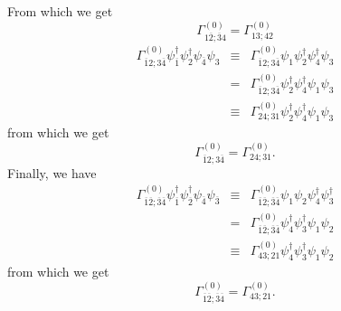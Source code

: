 From which we get
\begin{equation}
\Gamma^{(0)}_{1\overline{2};\overline{3}4}
= \Gamma^{(0)}_{1 3; 4 2}
\end{equation}
\begin{eqnarray}
\Gamma^{(0)}_{\overline{1}2;3\overline{4}}
\psi^{\dagger}_{\overline{1}}\psi^{\dagger}_2
\psi_{\overline{4}} \psi_3 
&  \equiv &
\Gamma^{(0)}_{\overline{1}2;3\overline{4}}
\psi_1\psi^{\dagger}_2
\psi^{\dagger}_4 \psi_3  \\
& = & \Gamma^{(0)}_{\overline{1}2;3\overline{4}}
\psi^{\dagger}_2\psi^{\dagger}_4\psi_1\psi_3 \\
& \equiv & \Gamma^{(0)}_{24;31}
\psi^{\dagger}_2\psi^{\dagger}_4\psi_1\psi_3
\end{eqnarray}
from which we get
\begin{equation}
\Gamma^{(0)}_{\overline{1}2;3\overline{4}} =
\Gamma^{(0)}_{24;31}.
\end{equation}
Finally, we have
\begin{eqnarray}
\Gamma^{(0)}_{\overline{1}\overline{2};\overline{3}\overline{4}}
\psi^{\dagger}_{\overline{1}}\psi^{\dagger}_{\overline{2}}
\psi_{\overline{4}} \psi_{\overline{3}} 
&  \equiv &
\Gamma^{(0)}_{\overline{1}\overline{2};\overline{3}\overline{4}}
\psi_1\psi_2
\psi^{\dagger}_4 \psi^{\dagger}_3  \\
& = &
\Gamma^{(0)}_{\overline{1}\overline{2};\overline{3}\overline{4}}
\psi^{\dagger}_4 \psi^{\dagger}_3 \psi_1\psi_2 \\
& \equiv &
\Gamma^{(0)}_{4 3; 2 1} \psi^{\dagger}_4 \psi^{\dagger}_3 \psi_1\psi_2
\end{eqnarray}
from which we get
\begin{equation}
\Gamma^{(0)}_{\overline{1}\overline{2};\overline{3}\overline{4}} =
\Gamma^{(0)}_{4 3; 2 1}.
\end{equation}

